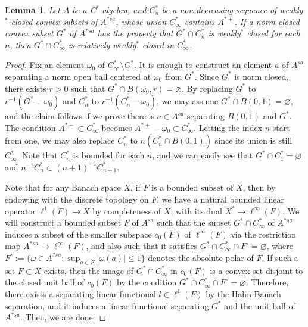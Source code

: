 \documentclass[a4paper]{amsart}
\theoremstyle{plain}
\newtheorem{lem}[thm]{Lemma}
\theoremstyle{definition}
\begin{document}
\begin{lem}\label{krein-smulian}
Let $A$ be a C$^*$-algebra, and $C^*_n$ be a non-decreasing sequence of weakly$^*$-closed convex subsets of $A^{*sa}$, whose union $C_\infty^*$ contains $A^{*+}$.
If a norm closed convex subset $G^*$ of $A^{*sa}$ has the property that $G^*\cap C^*_n$ is weakly$^*$ closed for each $n$, then $G^*\cap C_\infty^*$ is relatively weakly$^*$ closed in $C_\infty^*$.
\end{lem}
\begin{proof}
Fix an element $\omega_0$ of $C_\infty^*\setminus G^*$.
It is enough to construct an element $a$ of $A^{sa}$ separating a norm open ball centered at $\omega_0$ from $G^*$.
Since $G^*$ is norm closed, there exists $r>0$ such that $G^*\cap B(\omega_0,r)=\varnothing$.
By replacing $G^*$ to $r^{-1}(G^*-\omega_0)$ and $C_n^*$ to $r^{-1}(C_n^*-\omega_0)$, we may assume $G^*\cap B(0,1)=\varnothing$, and the claim follows if we prove there is $a\in A^{sa}$ separating $B(0,1)$ and $G^*$.
The condition $A^{*+}\subset C_\infty^*$ becomes $A^{*+}-\omega_0\subset C_\infty^*$.
Letting the index $n$ start from one, we may also replace $C_n^*$ to $n(C_n^*\cap B(0,1))$ since its union is still $C_\infty^*$.
Note that $C_n^*$ is bounded for each $n$, and we can easily see that $G^*\cap C_1^*=\varnothing$ and $n^{-1}C_n^*\subset(n+1)^{-1}C_{n+1}^*$.

Note that for any Banach space $X$, if $F$ is a bounded subset of $X$, then by endowing with the discrete topology on $F$, we have a natural bounded linear operator $\ell^1(F)\to X$ by completeness of $X$, with its dual $X^*\to\ell^\infty(F)$.
We will construct a bounded subset $F$ of $A^{sa}$ such that the subset $G^*\cap C_\infty^*$ of $A^{*sa}$ induces a subset of the smaller subspace $c_0(F)$ of $\ell^\infty(F)$ via the restriction map $A^{*sa}\to\ell^\infty(F)$, and also such that it satisfies $G^*\cap C_\infty^*\cap F^\circ=\varnothing$, where $F^\circ:=\{\omega\in A^{*sa}:\sup_{a\in F}|\omega(a)|\le1\}$ denotes the absolute polar of $F$.
If such a set $F\subset X$ exists, then the image of $G^*\cap C_\infty^*$ in $c_0(F)$ is a convex set disjoint to the closed unit ball of $c_0(F)$ by the condition $G^*\cap C_\infty^*\cap F^\circ=\varnothing$.
Therefore, there exists a separating linear functional $l\in\ell^1(F)$ by the Hahn-Banach separation, and it induces a linear functional separating $G^*$ and the unit ball of $A^{*sa}$.
Then, we are done.


\end{proof}
\end{document}
